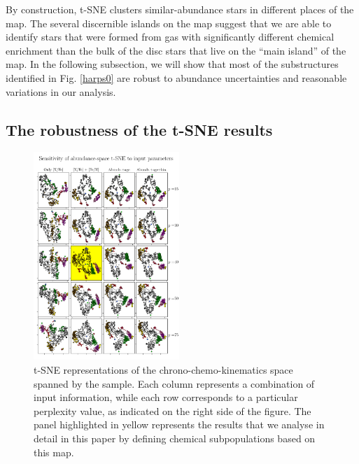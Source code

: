 \documentclass{aa}  %
\begin{document}
By construction, t-SNE clusters similar-abundance stars in different places of the map. The several discernible islands on the map suggest that we are able to identify stars that were formed from gas with significantly different chemical enrichment than the bulk of the disc stars that live on the ``main island'' of the map. In the following subsection, we will show that most of the substructures identified in Fig. \ref{harps0} are robust to abundance uncertainties and reasonable variations in our analysis.

\subsection{The robustness of the t-SNE results}\label{robust}

\begin{figure}\centering
 \includegraphics[width=0.49\textwidth]{im/harps-tSNE_perplexitytest_withsubsets.png}
\caption{t-SNE representations of the chrono-chemo-kinematics space spanned by the \citet{DelgadoMena2017} sample. Each column represents a combination of input information, while each row corresponds to a particular perplexity value, as indicated on the right side of the figure. The panel highlighted in yellow represents the results that we analyse in detail in this paper by defining chemical subpopulations based on this map.}
\label{perplexitytest2}
\end{figure}
\end{document}
